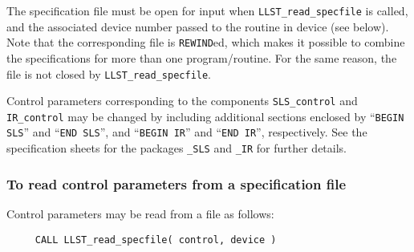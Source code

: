 \documentclass{galahad}
\newcommand{\packagename}{LLST}
\begin{document}
The specification file must be open for
input when {\tt \packagename\_read\_specfile}
is called, and the associated device number
passed to the routine in device (see below).
Note that the corresponding
file is {\tt REWIND}ed, which makes it possible to combine the specifications
for more than one program/routine.  For the same reason, the file is not
closed by {\tt \packagename\_read\_specfile}.

Control parameters corresponding to the components
{\tt SLS\_control}
and
{\tt IR\_control} may be changed by including additional sections enclosed by
``{\tt BEGIN SLS}'' and
``{\tt END SLS}'', and
``{\tt BEGIN IR}'' and
``{\tt END IR}'', respectively.
See the specification sheets for the packages
{\tt \libraryname\_SLS}
and
{\tt \libraryname\_IR}
for further details.

\subsubsection{To read control parameters from a specification file}
\label{readspec}

Control parameters may be read from a file as follows:
\hskip0.5in
\def\baselinestretch{0.8} {\tt \begin{verbatim}
     CALL LLST_read_specfile( control, device )
\end{verbatim}}
\def\baselinestretch{1.0}
\end{document}
